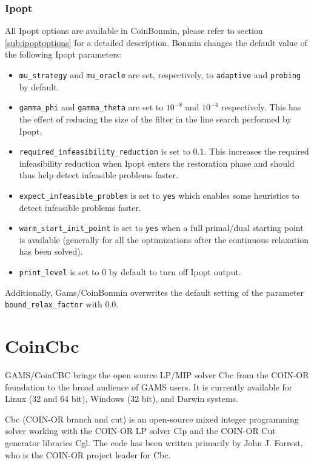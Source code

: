 \subsubsection{Ipopt}
All Ipopt options are available in CoinBonmin, please refer to section \ref{sub:ipoptoptions} for a detailed description.
Bonmin changes the default value of the following Ipopt parameters:
\begin{itemize}
\item \texttt{mu\_strategy} and \texttt{mu\_oracle} are set, respectively, to {\tt adaptive} and {\tt probing} by default.
\item \texttt{gamma\_phi} and \texttt{gamma\_theta} are set to $10^{-8}$ and $10^{-4}$ respectively. This has the effect of reducing the size of the filter in the line search performed by Ipopt.
\item \texttt{required\_infeasibility\_reduction} is set to $0.1$.
This increases the required infeasibility reduction when Ipopt enters the restoration phase and should thus help
detect infeasible problems faster.
\item \texttt{expect\_infeasible\_problem} is set to {\tt yes} which enables some heuristics to detect infeasible problems faster.
\item \texttt{warm\_start\_init\_point} is set to {\tt yes} when a full primal/dual starting point is available (generally for all the optimizations after the continuous relaxation has been solved).
\item \texttt{print\_level} is set to $0$ by default to turn off Ipopt output.
\end{itemize}

Additionally, Gams/CoinBonmin overwrites the default setting of the parameter \texttt{bound\_relax\_factor} with $0.0$.

\section{CoinCbc}

GAMS/CoinCBC brings the open source LP/MIP solver Cbc from the COIN-OR foundation to the broad audience of GAMS users. It is currently available for Linux (32 and 64 bit), Windows (32 bit), and Darwin systems.

Cbc (COIN-OR branch and cut) is an open-source mixed integer programming solver working with the COIN-OR LP solver Clp and the COIN-OR Cut generator libraries Cgl.
The code has been written primarily by John J. Forrest, who is the COIN-OR project leader for Cbc.

